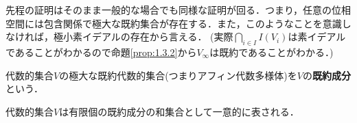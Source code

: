 \documentclass{myclass}
\begin{document}
\begin{remark}
  先程の証明はそのまま一般的な場合でも同様な証明が回る．つまり，任意の位相空間には包含関係で極大な既約集合が存在する．また，このようなことを意識しなければ，極小素イデアルの存在から言える．
  (実際$\bigcap_{i\in I}I(V_i)$は素イデアルであることがわかるので命題\ref{prop:1.3.2}から$V_{\infty}$は既約であることがわかる．)
\end{remark}

\begin{definition}
  代数的集合$V$の極大な既約代数的集合(つまりアフィン代数多様体)を$V$の\textbf{既約成分}という．
\end{definition}

\begin{proposition}
  代数的集合$V$は有限個の既約成分の和集合として一意的に表される．
\end{proposition}
\end{document}

